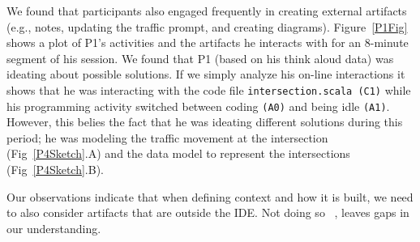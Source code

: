 We found that participants also engaged frequently in creating external artifacts (e.g., notes, updating the traffic prompt, and creating diagrams). Figure~\ref{P1Fig} shows a plot of P1's activities and the artifacts he interacts with for an 8-minute segment of his session. We found that P1 (based on his think aloud data) was ideating about possible solutions. If we simply analyze his on-line interactions it shows that he was interacting with the code file \texttt{intersection.scala (C1)} while his programming activity switched between coding \texttt{(A0)} and being idle \texttt{(A1)}. However, this belies the fact that he was ideating different solutions during this period; he was modeling the traffic movement at the intersection (Fig~\ref{P4Sketch}.A) and the data model to represent the  intersections (Fig~\ref{P4Sketch}.B).


Our observations indicate that when defining context and how it is built, we need to also consider artifacts that are outside the IDE. Not doing so ~\cite{Gasparic:2017,Kersten:2006}, leaves gaps in our understanding. 





